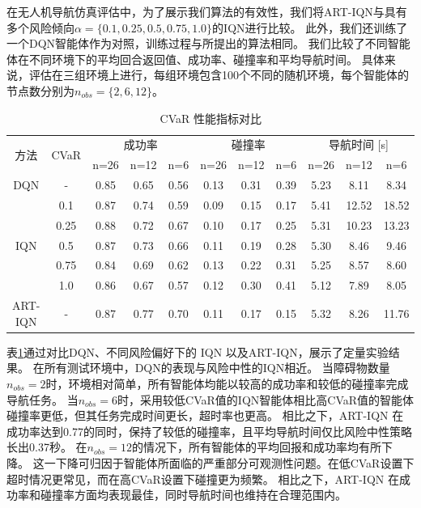 在无人机导航仿真评估中，为了展示我们算法的有效性，我们将ART-IQN与具有多个风险倾向$\alpha=\{0.1,0.25,0.5,0.75,1.0\}$的IQN进行比较。
此外，我们还训练了一个DQN智能体作为对照，训练过程与所提出的算法相同。
我们比较了不同智能体在不同环境下的平均回合返回值、成功率、碰撞率和平均导航时间。
具体来说，评估在三组环境上进行，每组环境包含100个不同的随机环境，每个智能体的节点数分别为$n_{obs}=\{2,6,12\}$。

\begin{table}[htbp]
  \centering
  \caption{CVaR 性能指标对比}
  \label{tab:cvar_comparison}
  \begin{tabular}{|c|c|*{9}{c|}}
    \hline
    \multirow{2}{*}{方法} & \multirow{2}{*}{CVaR} & \multicolumn{3}{c|}{成功率} & \multicolumn{3}{c|}{碰撞率} & \multicolumn{3}{c|}{导航时间 [s]} \\
    \cline{3-11}
    & & n=26 & n=12 & n=6 & n=26 & n=12 & n=6 & n=26 & n=12 & n=6 \\
    \hline
    DQN  & - & 0.85 & 0.65 & 0.56 & 0.13 & 0.31 & 0.39 & 5.23 & 8.11 & 8.34 \\
    \hline
    \multirow{5}{*}{IQN} & 0.1 & 0.87 & 0.74 & 0.59 & 0.09 & 0.15 & 0.17 & 5.41 & 12.52 & 18.52 \\
    & 0.25 & 0.88 & 0.72 & 0.67 & 0.10 & 0.17 & 0.25 & 5.31 & 10.23 & 13.23 \\
    & 0.5 & 0.87 & 0.73 & 0.66 & 0.11 & 0.19 & 0.28 & 5.30 & 8.46 & 9.46 \\
    & 0.75 & 0.84 & 0.69 & 0.62 & 0.13 & 0.22 & 0.31 & 5.25 & 8.57 & 8.60 \\
    & 1.0 & 0.86 & 0.67 & 0.57 & 0.12 & 0.30 & 0.41 & 5.12 & 7.89 & 8.05 \\
    \hline
    ART-IQN & - & 0.87 & 0.77 & 0.70 & 0.11 & 0.17 & 0.15 & 5.32 & 8.26 & 11.76 \\
    \hline
  \end{tabular}
\end{table}

表\ref{tab:cvar_comparison}通过对比DQN、不同风险偏好下的 IQN 以及ART-IQN，展示了定量实验结果。
在所有测试环境中，DQN的表现与风险中性的IQN相近。
当障碍物数量$n_{obs}=2$时，环境相对简单，所有智能体均能以较高的成功率和较低的碰撞率完成导航任务。
当$n_{obs}=6$时，采用较低CVaR值的IQN智能体相比高CVaR值的智能体碰撞率更低，但其任务完成时间更长，超时率也更高。
相比之下，ART-IQN 在成功率达到0.77的同时，保持了较低的碰撞率，且平均导航时间仅比风险中性策略长出0.37秒。
在$n_{obs}=12$的情况下，所有智能体的平均回报和成功率均有所下降。
这一下降可归因于智能体所面临的严重部分可观测性问题。在低CVaR设置下超时情况更常见，而在高CVaR设置下碰撞更为频繁。
相比之下，ART-IQN 在成功率和碰撞率方面均表现最佳，同时导航时间也维持在合理范围内。

